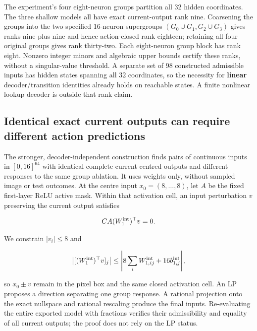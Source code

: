 \documentclass[
  british,
  11pt,
  a4paper,
]{article}
\begin{document}
The experiment's four eight-neuron groups partition all 32 hidden
coordinates. The three shallow models all have exact current-output rank
nine. Coarsening the groups into the two specified 16-neuron supergroups
\((G_0\cup G_1,G_2\cup G_3)\) gives ranks nine plus nine and hence
action-closed rank eighteen; retaining all four original groups gives
rank thirty-two. Each eight-neuron group block has rank eight. Nonzero
integer minors and algebraic upper bounds certify these ranks, without a
singular-value threshold. A separate set of 98 constructed admissible
inputs has hidden states spanning all 32 coordinates, so the necessity
for \textbf{linear} decoder/transition identities already holds on
reachable states. A finite nonlinear lookup decoder is outside that rank
claim.

\subsection{Identical exact current outputs can require different action
predictions}\label{identical-exact-current-outputs-can-require-different-action-predictions}

The stronger, decoder-independent construction finds pairs of continuous
inputs in \([0,16]^{64}\) with identical complete current centred
outputs and different responses to the same group ablation. It uses
weights only, without sampled image or test outcomes. At the centre
input \(x_0=(8,\ldots,8)\), let \(A\) be the fixed first-layer ReLU
active mask. Within that activation cell, an input perturbation \(v\)
preserving the current output satisfies

\[C A(W_1^{\rm int})^\top v=0.\]

We constrain \(|v_i|\le8\) and

\[\left|[(W_1^{\rm int})^\top v]_j\right|\le\left|8\sum_iW^{\rm int}_{1,ij}+16b^{\rm int}_{1,j}\right|,\]

so \(x_0\pm v\) remain in the pixel box and the same closed activation
cell. An LP proposes a direction separating one group response. A
rational projection onto the exact nullspace and rational rescaling
produce the final inputs. Re-evaluating the entire exported model with
fractions verifies their admissibility and equality of all current
outputs; the proof does not rely on the LP status.
\end{document}
